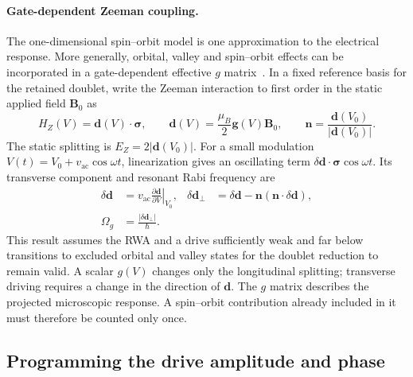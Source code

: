 \paragraph{Gate-dependent Zeeman coupling.}
The one-dimensional spin--orbit model is one approximation to the
electrical response. More generally, orbital, valley and spin--orbit
effects can be incorporated in a gate-dependent effective
$g$ matrix~\cite{Venitucci2018GMatrix}. In a fixed reference basis
for the retained doublet, write the Zeeman interaction to first
order in the static applied field $\mathbf B_0$ as
\begin{equation}
 H_Z(V)=\mathbf d(V)\cdot\boldsymbol\sigma,\qquad
 \mathbf d(V)=\frac{\mu_B}{2}\mathbf g(V)\mathbf B_0,\qquad
 \mathbf n=\frac{\mathbf d(V_0)}{|\mathbf d(V_0)|}.
 \label{eq:gate-dependent-zeeman}
\end{equation}
The static splitting is $E_Z=2|\mathbf d(V_0)|$.
For a small modulation $V(t)=V_0+v_{\mathrm{ac}}\cos\omega t$,
linearization gives an oscillating term
$\delta\mathbf d\cdot\boldsymbol\sigma\cos\omega t$.
Its transverse component and resonant Rabi frequency are
\begin{equation}
 \begin{aligned}
 \delta\mathbf d&=v_{\mathrm{ac}}
        \left.\frac{\partial\mathbf d}{\partial V}\right|_{V_0},
 &\delta\mathbf d_\perp
   &=\delta\mathbf d-\mathbf n(\mathbf n\cdot\delta\mathbf d),\\
 \Omega_g&=\frac{|\delta\mathbf d_\perp|}{\hbar}.
 \end{aligned}
 \label{eq:g-matrix-transverse-drive}
\end{equation}
This result assumes the RWA and a drive sufficiently weak and
far below transitions to excluded orbital and valley states for
the doublet reduction to remain valid. A scalar $g(V)$ changes only
the longitudinal splitting; transverse driving requires a change
in the direction of $\mathbf d$. The $g$ matrix describes the
projected microscopic response. A spin--orbit contribution already
included in it must therefore be counted only once.

\subsection{Programming the drive amplitude and phase}
\label{sec:drive-phase-programming}


